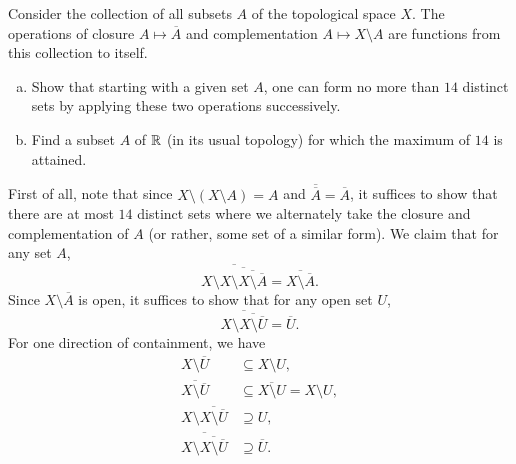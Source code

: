 \setcounter{exercise}{20}
\begin{exercise}
	Consider the collection of all subsets $A$ of the topological space $X$. The operations of closure $A\mapsto \overline{A}$ and complementation $A\mapsto X\setminus A$ are functions from this collection to itself.
	\begin{enumerate}[(a)]
		\item Show that starting with a given set $A$, one can form no more than $14$ distinct sets by applying these two operations successively.
		\item Find a subset $A$ of $\mathbb{R}$ (in its usual topology) for which the maximum of $14$ is attained.
	\end{enumerate}
\end{exercise}
\begin{solution*}
	First of all, note that since $X\setminus(X\setminus A) = A$ and $\overline{\overline{A}}=\overline{A}$, it suffices to show that there are at most $14$ distinct sets where we alternately take the closure and complementation of $A$ (or rather, some set of a similar form).
	We claim that for any set $A$,
	\[ \overline{X\setminus\overline{X\setminus\overline{X\setminus\overline{A}}}} = \overline{X\setminus\overline{A}}. \]
	Since $X\setminus\overline{A}$ is open, it suffices to show that for any open set $U$,
	\[ \overline{X\setminus\overline{X\setminus\overline{U}}} = \overline{U}. \]
	For one direction of containment, we have
	\begin{align*}
		X \setminus \overline{U} &\subseteq X \setminus U, \\
		\overline{X \setminus \overline{U}} &\subseteq \overline{X \setminus U} = X\setminus U, \\
		X \setminus\overline{X \setminus \overline{U}} &\supseteq U, \\
		\overline{X \setminus\overline{X \setminus \overline{U}}} &\supseteq \overline{U}.
	\end{align*}


\end{solution*}
